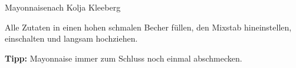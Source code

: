 \begin{recipe}{Mayonnaise}{nach Kolja Kleeberg}
  \label{Mayonnaise}
  \inglist
  
  \steps
  Alle Zutaten in einen hohen schmalen Becher füllen, den Mixstab hineinstellen,
  einschalten und langsam hochziehen.  
  
  \textbf{Tipp:} Mayonnaise immer zum Schluss noch einmal abschmecken.
  
\end{recipe}


